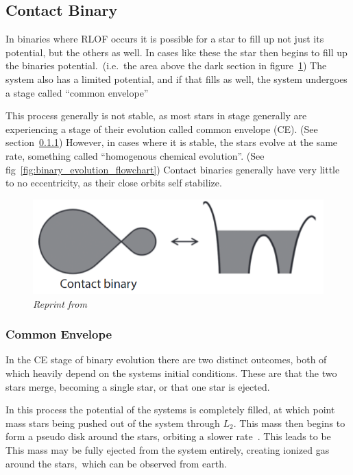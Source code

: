 \documentclass[12pt, letterpaper]{article}
\begin{document}
        \subsection{\centering Contact Binary}
        In binaries where RLOF occurs it is possible for a star to fill up not just its potential, but the others as well. In cases like these the star then begins to fill up the binaries potential.\ (i.e.\ the area above the dark section in figure~\ref{ContactBinaryRL}) The system also has a limited potential, and if that fills as well, the system undergoes a stage called ``common envelope''


        This process generally is not stable, as most stars in stage generally are experiencing a stage of their evolution called common envelope (CE). (See section~\ref{CommonEnvelope}) However, in cases where it is stable, the stars evolve at the same rate, something called ``homogenous chemical evolution''. (See fig~\ref{fig:binary_evolution_flowchart}) Contact binaries generally have very little to no eccentricity, as their close orbits self stabilize.~\cite{TaurisvandenHeuvel+2023}
        
        \begin{figure}  
            \centering
            \includegraphics[scale = .4]{Figs/Conact Binary.png}

            \caption{\textit{Reprint from~\cite{TaurisvandenHeuvel+2023}}}
            \label{ContactBinaryRL}
        \end{figure}
        
        \subsubsection{Common Envelope}\label{CommonEnvelope}
            In the CE stage of binary evolution there are two distinct outcomes, both of which heavily depend on the systems initial conditions. These are that the two stars merge, becoming a single star, or that one star is ejected. 

            In this process the potential of the systems is completely filled, at which point mass stars being pushed out of the system through $L_2$. This mass then begins to form a pseudo disk around the stars, orbiting a slower rate~\cite{TaurisvandenHeuvel+2023}. This leads to be  This mass may be fully ejected from the system entirely, creating ionized gas around the stars,~\cite{TaurisvandenHeuvel+2023}which can be observed from earth. 
\end{document}

